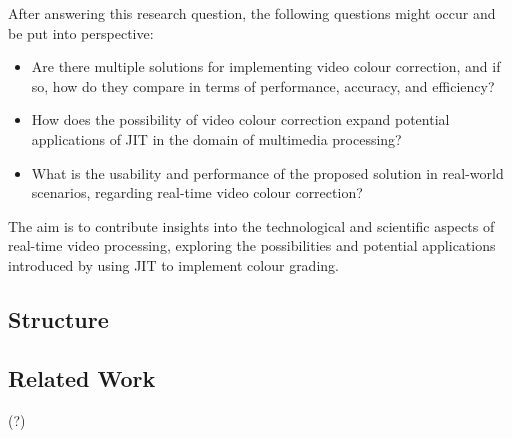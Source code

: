 \documentclass[12pt,a4paper]{article}
\begin{document}
After answering this research question, the following questions might occur and be put into perspective:

\begin{itemize}
	\item Are there multiple solutions for implementing video colour correction, and if so, how do they compare in terms of performance, accuracy, and efficiency?
	\item How does the possibility of video colour correction expand potential applications of JIT in the domain of multimedia processing?
	\item What is the usability and performance of the proposed solution in real-world scenarios, regarding real-time video colour correction?
\end{itemize}

The aim is to contribute insights into the technological and scientific aspects of real-time video processing, exploring the possibilities and potential applications introduced by using JIT to implement colour grading. 










\subsection{Structure}










\subsection{Related Work} 

\cite{frida} (?)





%
%
%
%
%
%
%
%
\newpage
\end{document}
